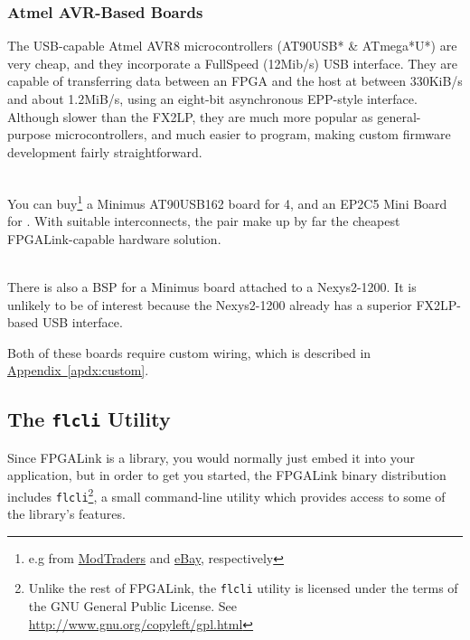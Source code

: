 \newpage
\subsubsection{Atmel AVR-Based Boards}

The USB-capable Atmel AVR8 microcontrollers (AT90USB* \& ATmega*U*) are very cheap, and they incorporate a FullSpeed (12Mib/s) USB interface. They are capable of transferring data between an FPGA and the host at between 330KiB/s and about 1.2MiB/s, using an eight-bit asynchronous EPP-style interface. Although slower than the FX2LP, they are much more popular as general-purpose microcontrollers, and much easier to program, making custom firmware development fairly straightforward.

\begin{desc}
  \item[\sffamily{Minimus/EP2C5 Board:}] \hfill \\
    You can buy\footnote{e.g from \href{http://www.modtraders.co.uk/minimus-avr-usb-development-board.html}{ModTraders} and \href{http://www.ebay.co.uk/itm/New-Altera-CycloneII-EP2C5T144-FPGA-Mini-Development-Board-/230767965142}{eBay}, respectively} a Minimus AT90USB162 board for \textsterling{}4, and an EP2C5 Mini Board for . With suitable interconnects, the pair make up by far the cheapest FPGALink-capable hardware solution.
  \item[\sffamily{Minimus/Nexys2 Board:}] \hfill \\
    There is also a BSP for a Minimus board attached to a Nexys2-1200. It is unlikely to be of interest because the Nexys2-1200 already has a superior FX2LP-based USB interface.
\end{desc}

Both of these boards require custom wiring, which is described in \hyperref[apdx:custom]{Appendix~\ref*{apdx:custom}}.

\subsection{The \texttt{flcli} Utility}
Since FPGALink is a library, you would normally just embed it into your application, but in order to get you started, the FPGALink binary distribution includes \texttt{flcli}\footnote{Unlike the rest of FPGALink, the \texttt{flcli} utility is licensed under the terms of the GNU General Public License. See \url{http://www.gnu.org/copyleft/gpl.html}}, a small command-line utility which provides access to some of the library's features.

